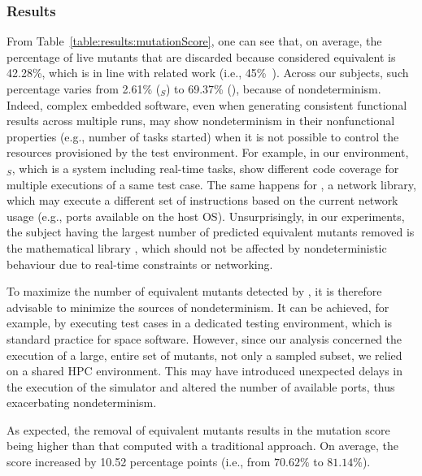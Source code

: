 \subsubsection{Results}
From Table~\ref{table:results:mutationScore}, one can see that, on average, the percentage of live mutants that are discarded because considered equivalent is 42.28\%, which is in line with related work (i.e., 45\%~\cite{zhang2013faster}). Across our subjects, such percentage varies from 2.61\% (\SAIL{}$_S$) to 69.37\% (\MLFS{}{}), because of nondeterminism.
Indeed, complex embedded software, even when generating consistent functional results across multiple runs, may show nondeterminism
in their nonfunctional properties (e.g., number of tasks started)
when it is not possible to control the resources provisioned by the test environment.
For example, in our environment, \SAIL{}$_S$, which is a system including real-time tasks, show different code coverage for multiple executions of a same test case. The same happens for \GCSP{}, a network library, which may execute
a different set of instructions
based on the current network usage (e.g., ports available on the host OS).
Unsurprisingly, in our experiments, the subject having the largest number of predicted equivalent mutants removed is the mathematical library \MLFS{}{}, which should not be affected by nondeterministic behaviour due to real-time constraints or networking.

To maximize the number of equivalent mutants detected by \APPR, it is therefore advisable to minimize the sources of nondeterminism. It can be achieved, for example, by executing test cases in a dedicated testing environment, which is standard practice for space software. However, since our analysis concerned the execution of a large, entire set of mutants, not only a sampled subset, we relied on a shared HPC environment. This may have introduced unexpected delays in the execution of the simulator and altered the number of available ports, thus exacerbating nondeterminism.

As expected, the removal of equivalent mutants results in the \APPR mutation score being higher than that computed with a traditional approach. On average, the score increased by 10.52 percentage points (i.e., from $70.62\%$ to $81.14\%$).

